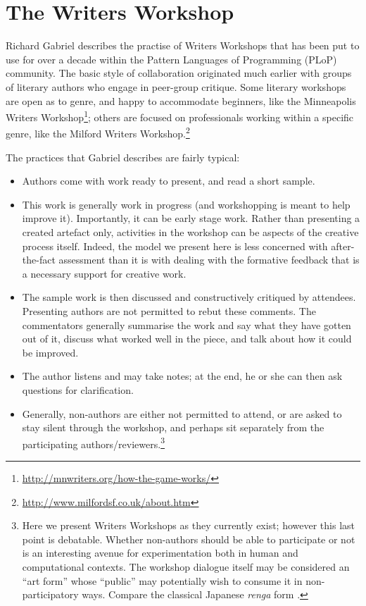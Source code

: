 \section{The Writers Workshop} \label{sec:writers-workshop}

Richard Gabriel \citeyear{gabriel2002writer} describes the practise of
Writers Workshops that has been put to use for over a decade within
the Pattern Languages of Programming (PLoP) community.  The basic
style of collaboration originated much earlier with groups of literary
authors who engage in peer-group critique.  Some literary workshops
are open as to genre, and happy to accommodate beginners, like the
Minneapolis Writers
Workshop\footnote{\url{http://mnwriters.org/how-the-game-works/}};
others are focused on professionals working within a specific genre,
like the Milford Writers
Workshop.\footnote{\url{http://www.milfordsf.co.uk/about.htm}}

The
practices that Gabriel describes are fairly typical:  
\begin{itemize}
\item Authors come with work ready to present, and read a short
  sample.
\item This work is generally work in progress (and workshopping is
  meant to help improve it).  Importantly, it can be early stage work.
  Rather than presenting a created artefact only, activities in the
  workshop can be aspects of the creative process itself.  Indeed, the
  model we present here is less concerned with after-the-fact
  assessment than it is with dealing with the formative feedback that
  is a necessary support for creative work.
\item The sample work is then
discussed and constructively critiqued by attendees.  Presenting
authors are not permitted to rebut these comments.  The commentators
generally summarise the work and say what they have gotten out of it,
discuss what worked well in the piece, and talk about how it could be
improved.  
\item The author listens and may take notes; at the end, he or
she can then ask questions for clarification.  
\item Generally, non-authors are either not permitted to attend, or
  are asked to stay silent through the workshop, and perhaps sit
  separately from the participating authors/reviewers.\footnote{Here
    we present Writers Workshops as they currently exist; however this
    last point is debatable. Whether non-authors should be able to
    participate or not is an interesting avenue for experimentation
    both in human and computational contexts.  The workshop dialogue
    itself may be considered an ``art form'' whose ``public'' may
    potentially wish to consume it in non-participatory ways.  Compare
    the classical Japanese \emph{renga} form \cite{jin1975art}.}
\end{itemize}

